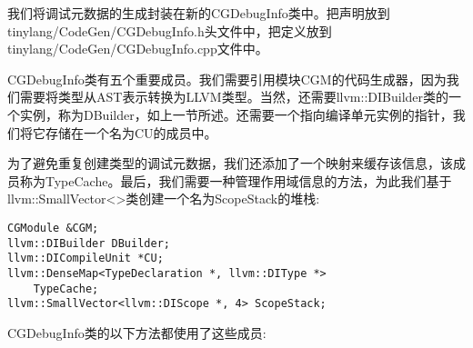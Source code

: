 我们将调试元数据的生成封装在新的CGDebugInfo类中。把声明放到tinylang/CodeGen/CG\allowbreak DebugInfo.h头文件中，把定义放到tinylang/CodeGen/CGDebugInfo.cpp文件中。\par

CGDebugInfo类有五个重要成员。我们需要引用模块CGM的代码生成器，因为我们需要将类型从AST表示转换为LLVM类型。当然，还需要llvm::DIBuilder类的一个实例，称为DBuilder，如上一节所述。还需要一个指向编译单元实例的指针，我们将它存储在一个名为CU的成员中。\par

为了避免重复创建类型的调试元数据，我们还添加了一个映射来缓存该信息，该成员称为TypeCache。最后，我们需要一种管理作用域信息的方法，为此我们基于llvm::SmallVector<>类创建一个名为ScopeStack的堆栈:\par

\begin{lstlisting}[caption={}]
CGModule &CGM;
llvm::DIBuilder DBuilder;
llvm::DICompileUnit *CU;
llvm::DenseMap<TypeDeclaration *, llvm::DIType *>
	TypeCache;
llvm::SmallVector<llvm::DIScope *, 4> ScopeStack;
\end{lstlisting}

CGDebugInfo类的以下方法都使用了这些成员:\par

